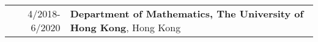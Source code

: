 \begin{longtable}{rX}
4/2018-6/2020 & {\bf Department of Mathematics, The University of Hong Kong}, Hong Kong\\
\end{longtable}
